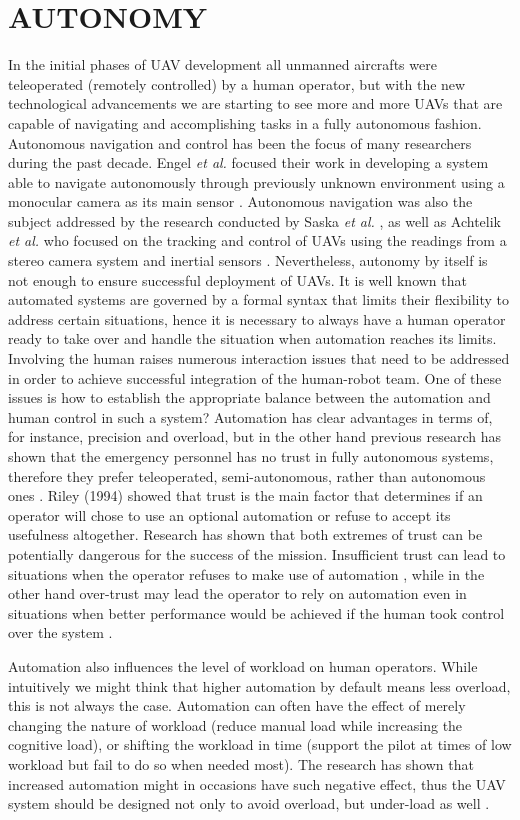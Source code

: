 \documentclass[12pt, letterpaper, oneside]{article}
\begin{document}
\section{AUTONOMY}
In the initial phases of UAV development all unmanned aircrafts were teleoperated (remotely controlled) by a human operator, but with the new technological advancements we are starting to see more and more UAVs that are capable of navigating and accomplishing tasks in a fully autonomous fashion. Autonomous navigation and control has been the focus of  many researchers during the past decade. Engel \emph{et al.} focused their work in developing a system able to navigate autonomously through previously unknown environment using a monocular camera as its main sensor \cite{13, 14, 15}. Autonomous navigation was also the subject addressed by the research conducted by Saska \emph{et al.} \cite{27}, as well as Achtelik \emph{et al.} who focused on the tracking and control of UAVs using the readings from a stereo camera system and inertial sensors \cite{21}. Nevertheless, autonomy by itself is not enough to ensure successful deployment of UAVs. It is well known that automated systems are governed by a formal syntax that limits their flexibility to address certain situations, hence it is necessary to always have a human operator ready to take over and handle the situation when automation reaches its limits. Involving the human raises numerous interaction issues that need to be addressed in order to achieve successful integration of the human-robot team. One of these issues is how to establish the appropriate balance between the automation and human control in such a system? \cite{17} Automation has clear advantages in terms of, for instance, precision and overload, but in the other hand previous research has shown that the emergency personnel has no trust in fully autonomous systems, therefore they prefer teleoperated, semi-autonomous, rather than autonomous ones \cite{7}. Riley (1994) showed that trust is the main factor that determines if an operator will chose to use an optional automation or refuse to accept its usefulness altogether. Research has shown that both extremes of trust can be potentially dangerous for the success of the mission. Insufficient trust can lead to situations when the operator refuses to make use of automation \cite{30}, while in the other hand over-trust may lead the operator to rely on automation even in situations when better performance would be achieved if the human took control over the system \cite{4}. 

Automation also influences the level of workload on human operators. While intuitively we might think that higher automation by default means less overload, this is not always the case. Automation can often have the effect of merely changing the nature of workload (reduce manual load while increasing the cognitive load), or shifting the workload in time (support the pilot at times of low workload but fail to do so when needed most). The research has shown that increased automation might in occasions have such negative effect, thus the UAV system should be designed not only to avoid overload, but under-load as well \cite{9}. 
\end{document}
